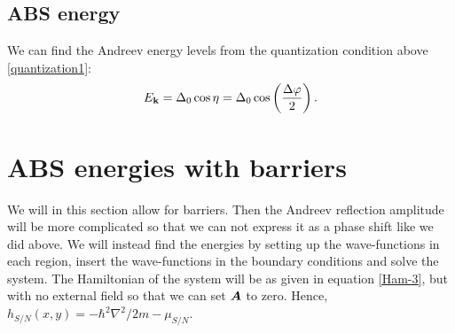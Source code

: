 \subsection{ABS energy}
We can find the Andreev energy levels from the quantization condition above \eqref{quantization1}:
\begin{equation}
    E_{\mathbf{k}} = \Delta_0 \cos \eta = \Delta_0\cos\left(\frac{\Delta\varphi}{2}\right).
    \label{AndreevEnergy1}
\end{equation}

\section{ABS energies with barriers}
We will in this section allow for barriers. Then the Andreev reflection amplitude will be more complicated so that we can not express it as a phase shift like we did above. We will instead find the energies by setting up the wave-functions in each region, insert the wave-functions in the boundary conditions and solve the system. The Hamiltonian of the system will be as given in equation \eqref{Ham-3}, but with no external field so that we can set $\boldsymbol{A}$ to zero. Hence, $h_{S/N}(x,y) = -\hbar^2\nabla^2/2m -\mu_{S/N}$.
\\
\\

